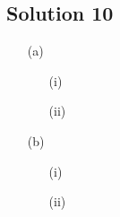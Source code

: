 \subsection*{Solution 10}

\begin{itemize}
\item[(a)]

\begin{itemize}
\item[(i)]
\todo
\item[(ii)]
\todo
\end{itemize}

\item[(b)]

\begin{itemize}
\item[(i)]
\todo
\item[(ii)]
\todo
\end{itemize}

\end{itemize}

